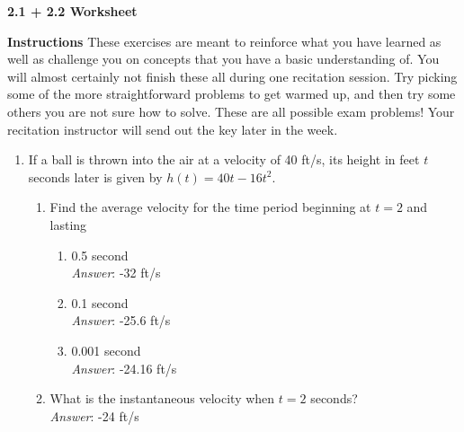 \documentclass[11pt]{article}
\begin{document}

\centerline{\textbf{\Large{2.1 + 2.2 Worksheet}}}

\vspace{0.2in}

{\bf Instructions} These exercises are meant to reinforce what you have learned as well as challenge you on concepts that you have a basic understanding of. You will almost certainly not finish these all during one recitation session. Try picking some of the more straightforward problems to get warmed up, and then try some others you are not sure how to solve. These are all possible exam problems! Your recitation instructor will send out the key later in the week. 


\begin{enumerate}

\item If a ball is thrown into the air at a velocity of 40 ft/s, its height in feet $t$ seconds later is given by $h(t)=40t-16t^2$.

\begin{enumerate}

\item Find the average velocity for the time period beginning at $t=2$ and lasting  

\begin{enumerate}

\item 0.5 second\\

{\em Answer}: -32 ft/s\\

\item 0.1 second\\

{\em Answer}: -25.6 ft/s\\

\item 0.001 second\\

{\em Answer}: -24.16 ft/s\\

\end{enumerate}



\item What is the instantaneous velocity when $t=2$ seconds?\\

{\em Answer}: -24 ft/s\\




\end{enumerate}
\end{enumerate}
\end{document}
